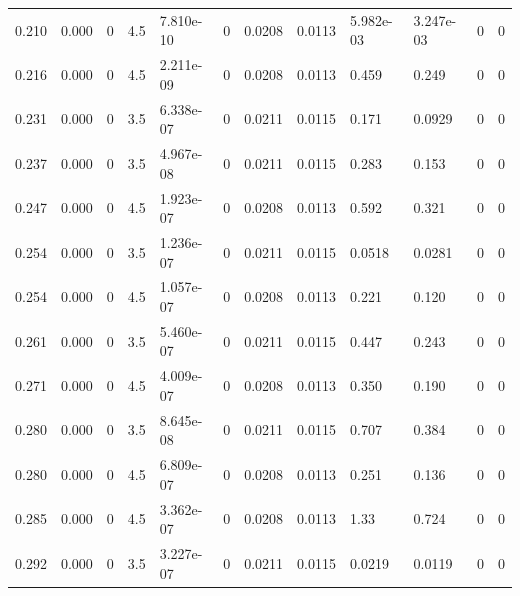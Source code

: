 \documentclass[preview]{standalone}
\begin{document}
{{\begin{tabular}{L{1.2cm}C{1.2cm} C{0.3cm}C{0.5cm} C{1.4cm}C{1.4cm} C{1.4cm}C{1.4cm} C{1.6cm}C{1.6cm} C{1.6cm}C{1.6cm}}
  0.210  &  0.000  & 0     & 4.5 &  7.810e-10  & 0  &  0.0208&   0.0113& 5.982e-03 & 3.247e-03   &  0 & 0  \\ 
  0.216  &  0.000  & 0     & 4.5 &  2.211e-09  & 0  &  0.0208&   0.0113& 0.459 & 0.249   &  0 & 0  \\ 
  0.231  &  0.000  & 0     & 3.5 &  6.338e-07  & 0  &  0.0211&   0.0115& 0.171 & 0.0929   &  0 & 0  \\ 
  0.237  &  0.000  & 0     & 3.5 &  4.967e-08  & 0  &  0.0211&   0.0115& 0.283 & 0.153   &  0 & 0  \\ 
  0.247  &  0.000  & 0     & 4.5 &  1.923e-07  & 0  &  0.0208&   0.0113& 0.592 & 0.321   &  0 & 0  \\ 
  0.254  &  0.000  & 0     & 3.5 &  1.236e-07  & 0  &  0.0211&   0.0115& 0.0518 & 0.0281   &  0 & 0  \\ 
  0.254  &  0.000  & 0     & 4.5 &  1.057e-07  & 0  &  0.0208&   0.0113& 0.221 & 0.120   &  0 & 0  \\ 
  0.261  &  0.000  & 0     & 3.5 &  5.460e-07  & 0  &  0.0211&   0.0115& 0.447 & 0.243   &  0 & 0  \\ 
  0.271  &  0.000  & 0     & 4.5 &  4.009e-07  & 0  &  0.0208&   0.0113& 0.350 & 0.190   &  0 & 0  \\ 
  0.280  &  0.000  & 0     & 3.5 &  8.645e-08  & 0  &  0.0211&   0.0115& 0.707 & 0.384   &  0 & 0  \\ 
  0.280  &  0.000  & 0     & 4.5 &  6.809e-07  & 0  &  0.0208&   0.0113& 0.251 & 0.136   &  0 & 0  \\ 
  0.285  &  0.000  & 0     & 4.5 &  3.362e-07  & 0  &  0.0208&   0.0113& 1.33 & 0.724   &  0 & 0  \\ 
  0.292  &  0.000  & 0     & 3.5 &  3.227e-07  & 0  &  0.0211&   0.0115& 0.0219 & 0.0119   &  0 & 0  \\ 
\hline 
\end{tabular} 

}}
\end{document}
